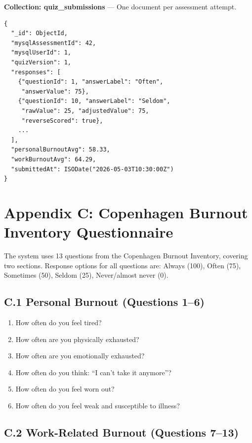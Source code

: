 \documentclass[12pt,a4paper]{article}
\begin{document}
\textbf{Collection: quiz\_submissions} --- One document per assessment
attempt.

\begin{verbatim}
{
  "_id": ObjectId,
  "mysqlAssessmentId": 42,
  "mysqlUserId": 1,
  "quizVersion": 1,
  "responses": [
    {"questionId": 1, "answerLabel": "Often",
     "answerValue": 75},
    {"questionId": 10, "answerLabel": "Seldom",
     "rawValue": 25, "adjustedValue": 75,
     "reverseScored": true},
    ...
  ],
  "personalBurnoutAvg": 58.33,
  "workBurnoutAvg": 64.29,
  "submittedAt": ISODate("2026-05-03T10:30:00Z")
}
\end{verbatim}

\newpage
\section*{Appendix C: Copenhagen Burnout Inventory Questionnaire}

The system uses 13 questions from the Copenhagen Burnout Inventory,
covering two sections. Response options for all questions are: Always
(100), Often (75), Sometimes (50), Seldom (25), Never/almost never (0).

\subsection*{C.1 Personal Burnout (Questions 1--6)}

\begin{enumerate}
  \item How often do you feel tired?
  \item How often are you physically exhausted?
  \item How often are you emotionally exhausted?
  \item How often do you think: ``I can't take it anymore''?
  \item How often do you feel worn out?
  \item How often do you feel weak and susceptible to illness?
\end{enumerate}

\subsection*{C.2 Work-Related Burnout (Questions 7--13)}
\end{document}
